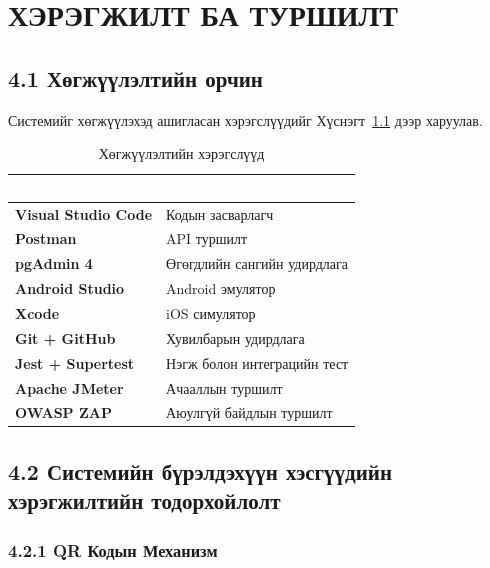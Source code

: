 \chapter{ХЭРЭГЖИЛТ БА ТУРШИЛТ}
\label{Chapter4}
\pagecolor{white}

\section{4.1 Хөгжүүлэлтийн орчин}

Системийг хөгжүүлэхэд ашигласан хэрэгслүүдийг Хүснэгт~\ref{tab:devtools} дээр харуулав.

\begin{table}[htbp]
\caption{Хөгжүүлэлтийн хэрэгслүүд}
\label{tab:devtools}
\centering
\begin{tabularx}{0.85\textwidth}{|>{\bfseries}X|X|}
\hline
\rowcolor{TableHeader}\textcolor{white}{\textbf{Хэрэгсэл}}
  & \textcolor{white}{\textbf{Зориулалт}} \\ \hline
Visual Studio Code & Кодын засварлагч \\ \hline
Postman            & API туршилт \\ \hline
pgAdmin 4          & Өгөгдлийн сангийн удирдлага \\ \hline
Android Studio     & Android эмулятор \\ \hline
Xcode              & iOS симулятор \\ \hline
Git + GitHub       & Хувилбарын удирдлага \\ \hline
Jest + Supertest   & Нэгж болон интеграцийн тест \\ \hline
Apache JMeter      & Ачааллын туршилт \\ \hline
OWASP ZAP          & Аюулгүй байдлын туршилт \\ \hline
\end{tabularx}
\end{table}

\section{4.2 Системийн бүрэлдэхүүн хэсгүүдийн хэрэгжилтийн тодорхойлолт}

\subsection{4.2.1 QR Кодын Механизм}

